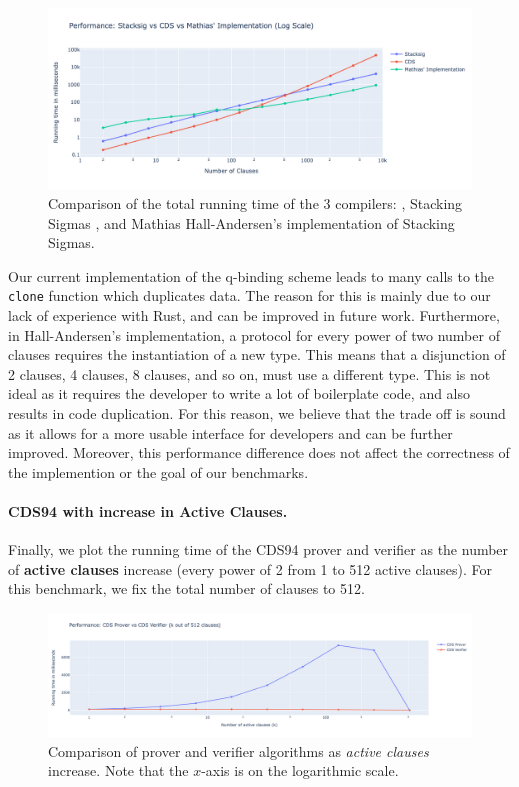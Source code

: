 \begin{figure}[H]
  \centering
  \includegraphics[width=0.9\linewidth]{../assets/plots/3log.png}
  \caption{Comparison of the total running time of the 3 compilers: \cite{CDS94}, 
  Stacking Sigmas \cite{StackingSigmas}, and
  Mathias Hall-Andersen's implementation \cite{MHAStackSig} of Stacking Sigmas.}
  \label{fig:3log}
\end{figure}

 

Our current implementation of the q-binding scheme leads to many calls to the 
\texttt{clone} function which duplicates data. The reason for this is mainly due 
to our lack of experience with Rust, and can be improved in future work. Furthermore, 
in Hall-Andersen's implementation, a protocol for every power of two number of 
clauses requires the instantiation of a new type. This means that 
a disjunction of 2 clauses, 4 clauses, 8 clauses, and so on, must use a different 
type. This is not ideal as it requires the developer to write a lot of boilerplate
code, and also results in code duplication. For this reason,
we believe that the trade off is sound as it allows for a more usable interface for 
developers and can be further improved. Moreover, this performance difference does 
not affect the correctness of the implemention or the goal of our benchmarks. 


\paragraph{CDS94 with increase in Active Clauses.} Finally, we plot the running time of the CDS94 prover and verifier as the number of
\textbf{active clauses} increase (every power of 2 from 1 to 512 active clauses). 
For this benchmark, we fix the total number of clauses to 512.

\begin{figure}[H]
  \centering
  \includegraphics[width=\linewidth]{../assets/plots/cds_threshold.png}
  \caption{Comparison of prover and verifier algorithms as \textit{active clauses} increase. Note that the $x$-axis is on the logarithmic scale.}
  \label{fig:cds_threshold}
\end{figure}

